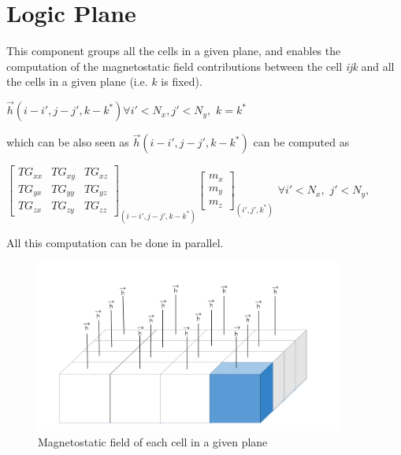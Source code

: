     \section{Logic Plane}
     This component groups all the cells in a given plane, and enables the computation of the magnetostatic field contributions between the cell \textit{ijk} and all the cells in a given plane (i.e. $ k $ is fixed).
     \begin{center}
     	$ \overrightarrow{h}(i-i',j-j',k-k^*)$\quad \quad $ \forall i'<N_x,$\quad $ j'<N_y,$ \qquad $ k=k^* $\\
     	   \end{center}
     	   which can be also seen as	$ \overrightarrow{h}(i-i',j-j',k-k^*)$ can be computed as
     	      \begin{center}
     	$ \begin{bmatrix}
     	TG_{xx} & TG_{xy} & TG_{xz}\\
     	TG_{yx} & TG_{yy}& TG_{yz}    	\\
     	TG_{zx}&TG_{zy} & TG_{zz}  
     	\end{bmatrix}_{(i-i',j-j',k-k^*)}\begin{bmatrix}
     	m_{x}\\
     	m_{y}\\
     	m_{z}\end{bmatrix}_{(i',j',k^*)} $ \quad \quad $ \forall i'<N_x,$ \quad $ j'<N_y,$ 
     \end{center}
          All this computation can be done in parallel. 
          
          \begin{figure}[h]
          	\centering
          	\includegraphics[width=0.9\textwidth]{imm/3d/logic_plane1.png}  
          	\caption{Magnetostatic field of each cell in a given plane}
          	\label{fig:logic_ plane}
          \end{figure}
